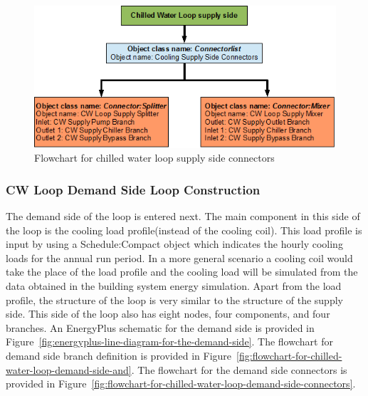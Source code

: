 \begin{figure}[htbp] %
\centering
\includegraphics{media/image020.png}
\caption{Flowchart for chilled water loop supply side connectors \protect \label{fig:flowchart-for-chilled-water-loop-supply-side-connectors}}
\end{figure}

\subsubsection{CW Loop Demand Side Loop Construction}\label{cw-loop-demand-side-loop-construction}

The demand side of the loop is entered next. The main component in this side of the loop is the cooling load profile(instead of the cooling coil). This load profile is input by using a Schedule:Compact object which indicates the hourly cooling loads for the annual run period. In a more general scenario a cooling coil would take the place of the load profile and the cooling load will be simulated from the data obtained in the building system energy simulation. Apart from the load profile, the structure of the loop is very similar to the structure of the supply side. This side of the loop also has eight nodes, four components, and four branches. An EnergyPlus schematic for the demand side is provided in Figure~\ref{fig:energyplus-line-diagram-for-the-demand-side}. The flowchart for demand side branch definition is provided in Figure~\ref{fig:flowchart-for-chilled-water-loop-demand-side-and}. The flowchart for the demand side connectors is provided in Figure~\ref{fig:flowchart-for-chilled-water-loop-demand-side-connectors}.

